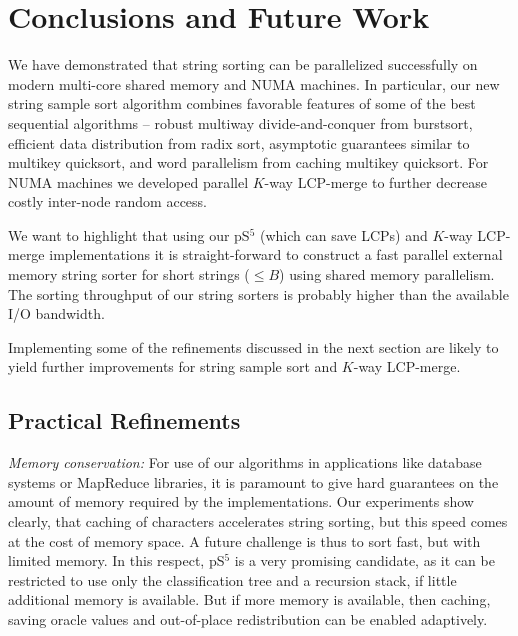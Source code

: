 \documentclass[a4paper]{myjournal}
\begin{document}
\FloatBarrier

\section{Conclusions and Future Work}\label{sec:conclusions}

We have demonstrated that string sorting can be parallelized successfully on
modern multi-core shared memory and NUMA machines. In particular, our new string
sample sort algorithm combines favorable features of some of the best sequential
algorithms -- robust multiway divide-and-conquer from burstsort, efficient data
distribution from radix sort, asymptotic guarantees similar to multikey
quicksort, and word parallelism from caching multikey quicksort.  For NUMA
machines we developed parallel $K$-way LCP-merge to further decrease costly
inter-node random access.

We want to highlight that using our pS$^5$ (which can save LCPs) and $K$-way
LCP-merge implementations it is straight-forward to construct a fast parallel
external memory string sorter for short strings ($\leq B$) using shared memory
parallelism. The sorting throughput of our string sorters is probably higher
than the available I/O bandwidth.

Implementing some of the refinements discussed in the next section are likely to
yield further improvements for string sample sort and $K$-way
LCP-merge.

\subsection{Practical Refinements}\label{app:refinements}

\emph{Memory conservation:} For use of our algorithms in applications like
database systems or MapReduce libraries, it is paramount to give hard guarantees
on the amount of memory required by the implementations. Our experiments show
clearly, that caching of characters accelerates string sorting, but this speed
comes at the cost of memory space. A future challenge is thus to sort fast, but
with limited memory. In this respect, pS$^5$ is a very promising candidate, as
it can be restricted to use only the classification tree and a recursion stack,
if little additional memory is available. But if more memory is available, then
caching, saving oracle values and out-of-place redistribution can be enabled
adaptively.
\end{document}
